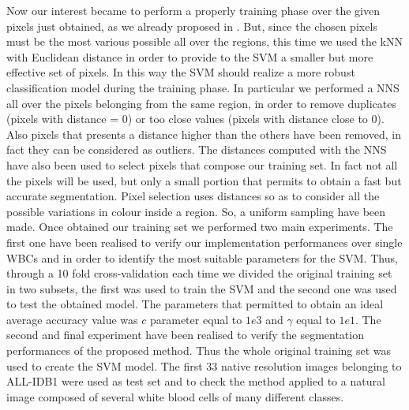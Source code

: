 \documentclass[final,a4paper,12pt,english]{UnicaPhdThesis3}
\begin{document}
	Now our interest became to perform a properly training phase over the given pixels just obtained, as we already proposed in \cite{putzu3}. But, since the chosen pixels must be the most various possible all over the regions, this time we used the kNN with Euclidean distance in order to provide to the SVM a smaller but more effective set of pixels. In this way the SVM should realize a more robust classification model during the training phase. In particular we performed a NNS all over the pixels belonging from the same region, in order to remove duplicates (pixels with distance = 0) or too close values (pixels with distance close to 0). Also pixels that presents a distance higher than the others have been removed, in fact they can be considered as outliers. The distances computed with the NNS have also been used to select pixels that compose our training set. In fact not all the pixels will be used, but only a small portion that permits to obtain a fast but accurate segmentation. Pixel selection uses distances so as to consider all the possible variations in colour inside a region. So, a uniform sampling have been made. Once obtained our training set we performed two main experiments. The first one have been realised to verify our implementation performances over single WBCs and in order to identify the most suitable parameters for the SVM. Thus, through a 10 fold cross-validation each time we divided the original training set in two subsets, the first was used to train the SVM and the second one was used to test the obtained model. The parameters that permitted to obtain an ideal average accuracy value was $c$ parameter equal to $1e3$ and $\gamma$ equal to $1e1$. The second and final experiment have been realised to verify the segmentation performances of the proposed method. Thus the whole original training set was used to create the SVM model. The first 33 native resolution images belonging to ALL-IDB1 were used as test set and to check the method applied to a natural image composed of several white blood cells of many different classes.
	
\end{document}
